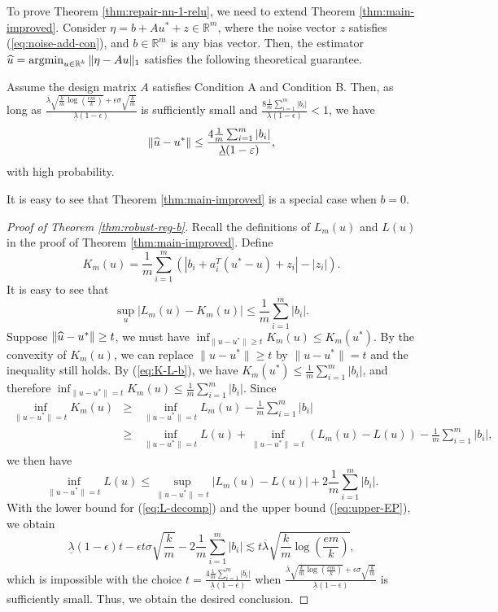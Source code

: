 To prove Theorem \ref{thm:repair-nn-1-relu}, we need to extend Theorem \ref{thm:main-improved}. Consider $\eta=b+Au^*+z\in\mathbb{R}^m$, where the noise vector $z$ satisfies (\ref{eq:noise-add-con}), and $b\in\mathbb{R}^m$ is any bias vector. Then, the estimator $\widehat{u}=\mathop{\rm argmin}_{u\in\mathbb{R}^k}\|\eta-Au\|_1$ satisfies the following theoretical guarantee.
\begin{thm}\label{thm:robust-reg-b}
Assume the design matrix $A$ satisfies Condition A and Condition B. Then, as long as $\frac{\overline{\lambda}\sqrt{\frac{k}{m}\log\left(\frac{em}{k}\right)}+\epsilon\sigma\sqrt{\frac{k}{m}}}{\underline{\lambda}(1-\epsilon)}$ is sufficiently small and $\frac{8\frac{1}{m}\sum_{i=1}^m|b_i|}{\underline{\lambda}(1-\epsilon)}<1$, we have
$$\|\widehat{u}-u^*\|\leq \frac{4\frac{1}{m}\sum_{i=1}^m|b_i|}{\underline{\lambda}(1-\varepsilon)},$$
with high probability.
\end{thm}
It is easy to see that Theorem \ref{thm:main-improved} is a special case when $b=0$.
\begin{proof}[Proof of Theorem \ref{thm:robust-reg-b}]
Recall the definitions of $L_m(u)$ and $L(u)$ in the proof of Theorem \ref{thm:main-improved}. Define
$$K_m(u)=\frac{1}{m}\sum_{i=1}^m\left(|b_i+a_i^T(u^*-u)+z_i|-|z_i|\right).$$
It is easy to see that
\begin{equation}
\sup_u|L_m(u)-K_m(u)|\leq \frac{1}{m}\sum_{i=1}^m|b_i|.\label{eq:K-L-b}
\end{equation}
Suppose $\|\widehat{u}-u^*\|\geq t$, we must have $\inf_{\|u-u^*\|\geq t}K_m(u) \leq K_m(u^*)$.
By the convexity of $K_m(u)$, we can replace $\|u-u^*\|\geq t$ by $\|u-u^*\| = t$ and the inequality still holds. By (\ref{eq:K-L-b}), we have $K_m(u^*)\leq \frac{1}{m}\sum_{i=1}^m|b_i|$, and therefore $\inf_{\|u-u^*\|= t}K_m(u)\leq \frac{1}{m}\sum_{i=1}^m|b_i|$. Since
\begin{eqnarray*}
\inf_{\|u-u^*\|= t}K_m(u) &\geq& \inf_{\|u-u^*\|= t}L_m(u) - \frac{1}{m}\sum_{i=1}^m|b_i| \\
&\geq& \inf_{\|u-u^*\|=t}L(u) + \inf_{\|u-u^*\|= t}(L_m(u)-L(u)) - \frac{1}{m}\sum_{i=1}^m|b_i|,
\end{eqnarray*}
we then have
\begin{equation}
\inf_{\|u-u^*\|=t}L(u) \leq \sup_{\|u-u^*\|= t}|L_m(u)-L(u)| + 2\frac{1}{m}\sum_{i=1}^m|b_i|. \label{eq:basic-L}
\end{equation}
With the lower bound for (\ref{eq:L-decomp}) and the upper bound (\ref{eq:upper-EP}), we obtain
$$\underline{\lambda}(1-\epsilon)t - \epsilon t\sigma\sqrt{\frac{k}{m}} - 2\frac{1}{m}\sum_{i=1}^m|b_i|\lesssim t\overline{\lambda}\sqrt{\frac{k}{m}\log\left(\frac{em}{k}\right)},$$
which is impossible with the choice $t=\frac{4\frac{1}{m}\sum_{i=1}^m|b_i|}{\underline{\lambda}(1-\epsilon)}$ when $\frac{\overline{\lambda}\sqrt{\frac{k}{m}\log\left(\frac{em}{k}\right)}+\epsilon\sigma\sqrt{\frac{k}{m}}}{\underline{\lambda}(1-\epsilon)}$ is sufficiently small. Thus, we obtain the desired conclusion.
\end{proof}

